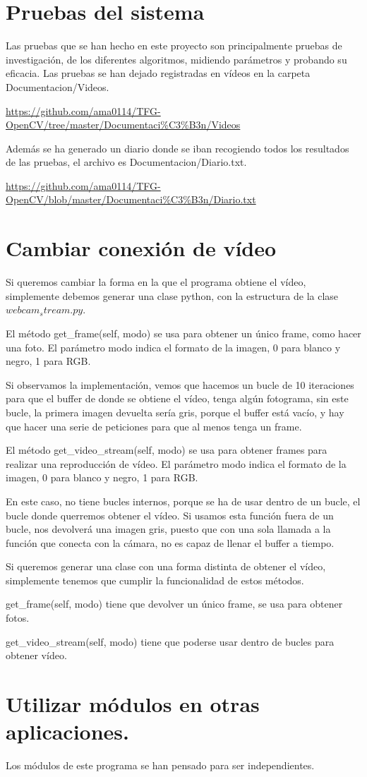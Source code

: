 \section{Pruebas del sistema}
Las pruebas que se han hecho en este proyecto son principalmente pruebas de investigación, de los diferentes algoritmos, midiendo parámetros y probando su eficacia. Las pruebas se han dejado registradas en vídeos en la carpeta Documentacion/Videos.

\url{https://github.com/ama0114/TFG-OpenCV/tree/master/Documentaci%C3%B3n/Videos}

Además se ha generado un diario donde se iban recogiendo todos los resultados de las pruebas, el archivo es Documentacion/Diario.txt.

\url{https://github.com/ama0114/TFG-OpenCV/blob/master/Documentaci%C3%B3n/Diario.txt}

\section{Cambiar conexión de vídeo}
Si queremos cambiar la forma en la que el programa obtiene el vídeo, simplemente debemos generar una clase python, con la estructura de la clase $webcam_stream.py$.

El método get\_frame(self, modo) se usa para obtener un único frame, como hacer una foto. El parámetro modo indica el formato de la imagen, 0 para blanco y negro, 1 para RGB. 

Si observamos la implementación, vemos que hacemos un bucle de 10 iteraciones para que el buffer de donde se obtiene el vídeo, tenga algún fotograma, sin este bucle, la primera imagen devuelta sería gris, porque el buffer está vacío, y hay que hacer una serie de peticiones para que al menos tenga un frame.

El método get\_video\_stream(self, modo) se usa para obtener frames para realizar una reproducción de vídeo.
 El parámetro modo indica el formato de la imagen, 0 para blanco y negro, 1 para RGB. 
 
En este caso, no tiene bucles internos, porque se ha de usar dentro de un bucle, el bucle donde querremos obtener el vídeo. Si usamos esta función fuera de un bucle, nos devolverá una imagen gris, puesto que con una sola llamada a la función que conecta con la cámara, no es capaz de llenar el buffer a tiempo.

Si queremos generar una clase con una forma distinta de obtener el vídeo, simplemente tenemos que cumplir la funcionalidad de estos métodos. 

get\_frame(self, modo) tiene que devolver un único frame, se usa para obtener fotos. 

get\_video\_stream(self, modo) tiene que poderse usar dentro de bucles para obtener vídeo.

\section{Utilizar módulos en otras aplicaciones.}
Los módulos de este programa se han pensado para ser independientes.


